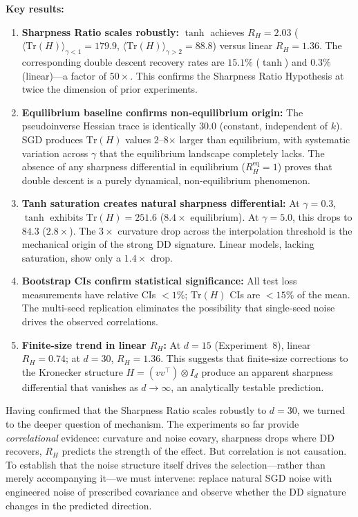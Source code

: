 \documentclass[
  journal=largetwo,
  simfonts=false,
  year=2025,
  volume=37,
]{cup-journal}
\begin{document}
\textbf{Key results:}
\begin{enumerate}
    \item \textbf{Sharpness Ratio scales robustly:} $\tanh$ achieves $R_H = 2.03$ ($\langle\mathrm{Tr}(H)\rangle_{\gamma<1} = 179.9$, $\langle\mathrm{Tr}(H)\rangle_{\gamma>2} = 88.8$) versus linear $R_H = 1.36$. The corresponding double descent recovery rates are $15.1\%$ ($\tanh$) and $0.3\%$ (linear)---a factor of $50\times$. This confirms the Sharpness Ratio Hypothesis at twice the dimension of prior experiments.
    
    \item \textbf{Equilibrium baseline confirms non-equilibrium origin:} The pseudoinverse Hessian trace is identically $30.0$ (constant, independent of $k$). SGD produces $\mathrm{Tr}(H)$ values 2--8$\times$ larger than equilibrium, with systematic variation across $\gamma$ that the equilibrium landscape completely lacks. The absence of any sharpness differential in equilibrium ($R_H^{\mathrm{eq}} = 1$) proves that double descent is a purely dynamical, non-equilibrium phenomenon.
    
    \item \textbf{Tanh saturation creates natural sharpness differential:} At $\gamma = 0.3$, $\tanh$ exhibits $\mathrm{Tr}(H) = 251.6$ ($8.4\times$ equilibrium). At $\gamma = 5.0$, this drops to $84.3$ ($2.8\times$). The $3\times$ curvature drop across the interpolation threshold is the mechanical origin of the strong DD signature. Linear models, lacking saturation, show only a $1.4\times$ drop.
    
    \item \textbf{Bootstrap CIs confirm statistical significance:} All test loss measurements have relative CIs $< 1\%$; $\mathrm{Tr}(H)$ CIs are $< 15\%$ of the mean. The multi-seed replication eliminates the possibility that single-seed noise drives the observed correlations.
    
    \item \textbf{Finite-size trend in linear $R_H$:} At $d=15$ (Experiment~8), linear $R_H = 0.74$; at $d=30$, $R_H = 1.36$. This suggests that finite-size corrections to the Kronecker structure $H = (vv^\top) \otimes I_d$ produce an apparent sharpness differential that vanishes as $d \to \infty$, an analytically testable prediction.
\end{enumerate}

Having confirmed that the Sharpness Ratio scales robustly to $d=30$, we turned to the deeper question of mechanism. The experiments so far provide \textit{correlational} evidence: curvature and noise covary, sharpness drops where DD recovers, $R_H$ predicts the strength of the effect. But correlation is not causation. To establish that the noise structure itself drives the selection---rather than merely accompanying it---we must intervene: replace natural SGD noise with engineered noise of prescribed covariance and observe whether the DD signature changes in the predicted direction.
\end{document}
